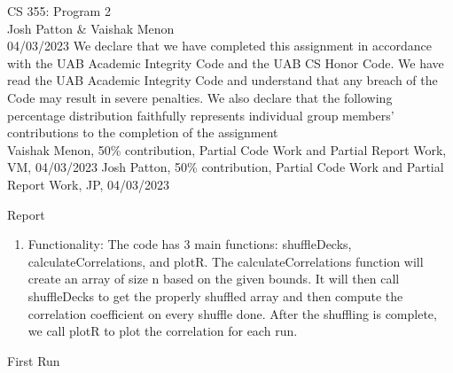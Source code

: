 \documentclass[12pt]{article}
\begin{document}
	\begin{titlepage}
		\begin{center}
			\hspace{0pt}
				\vfill
					\Huge CS 355: Program 2\\
					\Large Josh Patton \& Vaishak Menon\\
					\Large 04/03/2023
				\vfill
			\hspace{0pt}
            \small We declare that we have completed this assignment in accordance with 
            the UAB Academic Integrity Code and the UAB CS Honor Code. We have 
            read the UAB Academic Integrity Code and understand that any breach 
            of the Code may result in severe penalties.
            We  also  declare  that  the  following  percentage  distribution 
            faithfully  represents  individual  group  members’  contributions  to 
            the completion of the assignment\\
            \small Vaishak Menon, 50\% contribution, Partial Code Work and Partial Report Work, VM, 04/03/2023
            \small Josh Patton, 50\% contribution, Partial Code Work and Partial Report Work, JP, 04/03/2023
		\end{center}
	\end{titlepage}
	\newpage
	\begin{center}
	\Large Report\\
	\end{center}
    \begin{enumerate}
        \item Functionality:
        \subitem The code has 3 main functions: shuffleDecks, calculateCorrelations, and plotR. The calculateCorrelations function 
        will create an array of size n based on the given bounds. It will then call shuffleDecks to get the properly shuffled array 
        and then compute the correlation coefficient on every shuffle done. After the shuffling is complete, we call plotR to 
        plot the correlation for each run.
    \end{enumerate}
    \begin{center}
        \small First Run
    \end{center}
\end{document}
